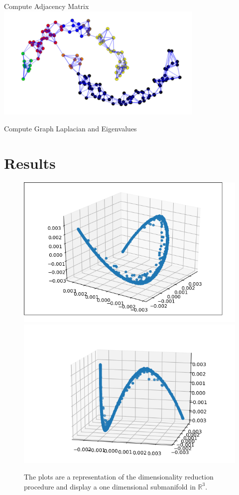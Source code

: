 \documentclass{beamer}
\begin{document}
\begin{frame}{Compute Adjacency Matrix}
    \centering \includegraphics[width=0.75\textwidth]{K7Nearest.png}
\end{frame}

\begin{frame}{Compute Graph Laplacian and Eigenvalues} 
\centering{}
\end{frame}
 
\section{Results} 
\begin{frame}
  \begin{figure}
\begin{center}
  \includegraphics[width=.45\linewidth]{view1.png}\includegraphics[width=.5\linewidth]{view2.png}
  \caption{The plots are a representation of the dimensionality reduction procedure and display a one dimensional submanifold in $\mathbb{R}^3$.}
   \label{fig:data_curve}
  \end{center}
\end{figure}
\end{frame}
\end{document}
